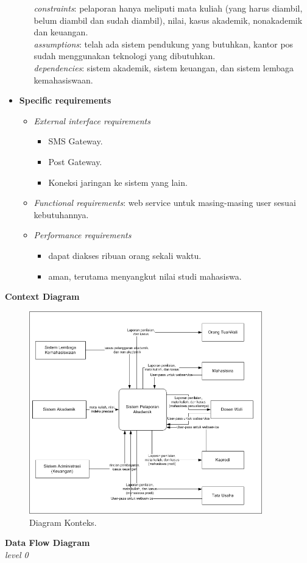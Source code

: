 \documentclass[paper=a4, fontsize=11pt]{scrartcl}
\numberwithin{equation}{section} %
\numberwithin{figure}{section} %
\numberwithin{table}{section} %
\begin{document}
\begin{itemize}
\begin{itemize}
		\textit{constraints}: pelaporan hanya meliputi mata kuliah (yang harus diambil, belum diambil dan sudah diambil), nilai, kasus akademik, nonakademik dan keuangan.\\
		\textit{assumptions}: telah ada sistem pendukung yang butuhkan, kantor pos sudah menggunakan teknologi yang dibutuhkan.\\
		\textit{dependencies}: sistem akademik, sistem keuangan, dan sistem lembaga kemahasiswaan.
	\end{itemize}
\item \textbf{Specific requirements}
	\begin{itemize}		
	\item \textit{External interface requirements}
	\begin{itemize}
		\item SMS Gateway.
		\item Post Gateway.
		\item Koneksi jaringan ke sistem yang lain.
	\end{itemize}

	\item \textit{Functional requirements}: web service untuk masing-masing user sesuai kebutuhannya.
	\item \textit{Performance requirements}
	\begin{itemize}
		\item dapat diakses ribuan orang sekali waktu.
		\item aman, terutama menyangkut nilai studi mahasiswa.
	\end{itemize}
	\end{itemize}
\end{itemize}		
		

\newpage
\large \textbf{Context Diagram}
\begin{figure}
	\centering
	\includegraphics[width=0.9\textwidth]{diagramkonteksSPA.png}
	\caption{Diagram Konteks.}
\end{figure}

\newpage
\large \textbf{Data Flow Diagram}\\
\textit{level 0}
\end{document}
